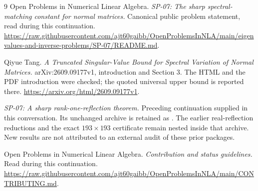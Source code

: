 \documentclass[11pt]{article}
\theoremstyle{remark}
\begin{document}
\begin{thebibliography}{9}
 Open Problems in Numerical Linear Algebra.
\emph{SP-07: The sharp spectral-matching constant for normal matrices.}
Canonical public problem statement, read during this continuation.
\url{https://raw.githubusercontent.com/ajt60gaibb/OpenProblemsInNLA/main/eigenvalues-and-inverse-problems/SP-07/README.md}.

 Qiyue Tang.
\emph{A Truncated Singular-Value Bound for Spectral Variation of Normal Matrices.}
arXiv:2609.09177v1, introduction and Section 3. The HTML and the PDF introduction were checked; the quoted universal upper bound is reported there.
\url{https://arxiv.org/html/2609.09177v1}.

 \emph{SP-07: A sharp rank-one-reflection theorem.}
Preceding continuation supplied in this conversation. Its unchanged archive is retained as
. The earlier real-reflection reductions and the exact $193\times193$ certificate remain nested inside that archive. New results are not attributed to an external audit of these prior packages.

 Open Problems in Numerical Linear Algebra.
\emph{Contribution and status guidelines.} Read during this continuation.
\url{https://raw.githubusercontent.com/ajt60gaibb/OpenProblemsInNLA/main/CONTRIBUTING.md}.
\end{thebibliography}
\end{document}
